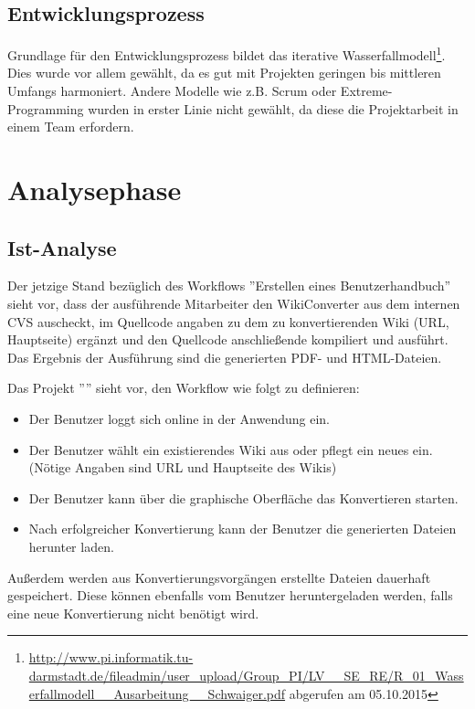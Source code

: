 \documentclass[12pt, xcolor=dvipsnames]{scrartcl}
\begin{document}
\subsection{Entwicklungsprozess}

Grundlage für den Entwicklungsprozess bildet das iterative Wasserfallmodell\footnote{\url{http://www.pi.informatik.tu-darmstadt.de/fileadmin/user_upload/Group_PI/LV__SE_RE/R_01_Wasserfallmodell__Ausarbeitung__Schwaiger.pdf} abgerufen am 05.10.2015}.
Dies wurde vor allem gewählt, da es gut mit Projekten geringen bis mittleren Umfangs harmoniert. Andere Modelle wie z.B. Scrum oder Extreme-Programming wurden in erster Linie nicht gewählt, da diese die Projektarbeit in einem Team erfordern.

\section{Analysephase}

\subsection{Ist-Analyse}

Der jetzige Stand bezüglich des Workflows ''Erstellen eines Benutzerhandbuch'' sieht vor, dass der ausführende Mitarbeiter den WikiConverter aus dem internen CVS auscheckt, im Quellcode angaben zu dem zu konvertierenden Wiki (URL, Hauptseite) ergänzt und den Quellcode anschließende kompiliert und ausführt. Das Ergebnis der Ausführung sind die generierten PDF- und HTML-Dateien.

Das Projekt ''\Projekt'' sieht vor, den Workflow wie folgt zu definieren:
\begin{itemize}
	\item Der Benutzer loggt sich online in der Anwendung ein.
	\item Der Benutzer wählt ein existierendes Wiki aus oder pflegt ein neues ein. (Nötige Angaben sind URL und Hauptseite des Wikis)
	\item Der Benutzer kann über die graphische Oberfläche das Konvertieren starten.
	\item Nach erfolgreicher Konvertierung kann der Benutzer die generierten Dateien herunter laden.
\end{itemize}

Außerdem werden aus Konvertierungsvorgängen erstellte Dateien dauerhaft gespeichert. Diese können ebenfalls vom Benutzer heruntergeladen werden, falls eine neue Konvertierung nicht benötigt wird.
\end{document}

